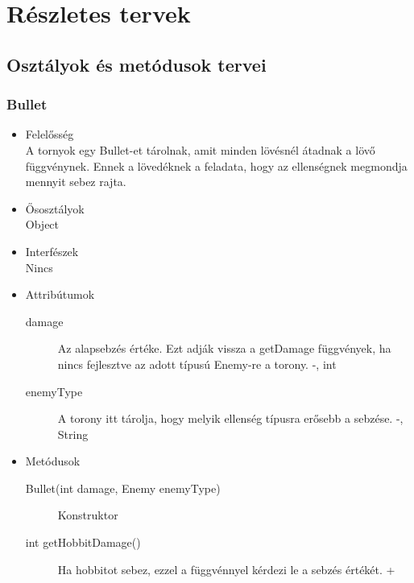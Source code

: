 %
\chapter{Részletes tervek}

\thispagestyle{fancy}

\section{Osztályok és metódusok tervei}

\subsection{Bullet}
\begin{itemize}
\item Felelősség\\
A tornyok egy Bullet-et tárolnak, amit minden lövésnél átadnak a lövő függvénynek. Ennek a lövedéknek a feladata, hogy az ellenségnek megmondja mennyit sebez rajta.
\item Ősosztályok\\
Object
\item Interfészek\\
Nincs
\item Attribútumok\\
	\begin{description}
		\item[damage] Az alapsebzés értéke. Ezt adják vissza a getDamage függvények, ha nincs fejlesztve az adott típusú Enemy-re a torony. -, int
		\item[enemyType] A torony itt tárolja, hogy melyik ellenség típusra erősebb a sebzése. -, String
	\end{description}
\item Metódusok\\
	\begin{description}
		\item[Bullet(int damage, Enemy enemyType)] Konstruktor
\item[int getHobbitDamage()] Ha hobbitot sebez, ezzel a függvénnyel kérdezi le a sebzés értékét. + 

\end{description}
\end{itemize}

